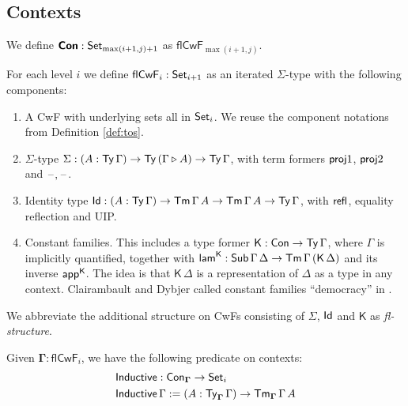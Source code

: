 \documentclass[sigplan,review,anonymous]{acmart}\settopmatter{printfolios=true,printccs=false,printacmref=false}
\newcommand{\ext}{\triangleright}
\newcommand{\Inductive}{\mathsf{Inductive}}
\newcommand{\Sg}{\Sigma}
\newcommand{\flCwF}{\mathsf{flCwF}}
\newcommand{\Kfam}{\mathsf{K}}
\newcommand{\lamK}{\mathsf{lam}^{\K}}
\newcommand{\appK}{\mathsf{app}^{\K}}
\newcommand{\bCon}{\boldsymbol{\Con}}
\newcommand{\bGamma}{\boldsymbol{\Gamma}}
\begin{document}
\subsection{Contexts}

We define $\bCon : \Set_{\max(i+1,j)+1}$ as $\flCwF_{\max(i+1,j)}$.

\begin{definition}\label{def:flCwF}
For each level $i$ we define $\flCwF_i : \Set_{i+1}$ as an iterated $\Sigma$-type
with the following components:
\begin{enumerate}
  \item A CwF with underlying sets all in $\mathsf{Set}_i$. We reuse the component
    notations from Definition \ref{def:tos}.
  \item $\Sigma$-type $\Sg : (A : \Ty\,\Gamma)\ra \Ty\,(\Gamma \ext A)
    \ra \Ty\,\Gamma$, with term formers $\mathsf{proj}1$, $\mathsf{proj}2$ and $\mathord{\hspace{1pt}\text{--}\hspace{1pt}},\mathord{\hspace{1pt}\text{--}\hspace{1pt}}$.
  \item Identity type $\mathsf{Id} : (A : \mathsf{Ty}\,\Gamma)\rightarrow \mathsf{Tm}\,\Gamma\,A\rightarrow
    \mathsf{Tm}\,\Gamma\,A\rightarrow \mathsf{Ty}\,\Gamma$, with $\mathsf{refl}$, equality reflection and UIP.
  \item Constant families. This includes a type former $\Kfam : \Con \ra
    \Ty\,\Gamma$, where $\Gamma$ is implicitly quantified, together with $\lamK
    : \Sub\,\Gamma\,\Delta \ra \Tm\,\Gamma\,(\Kfam\,\Delta)$ and its inverse
    $\appK$. The idea is that $\Kfam\,\Delta$ is a representation of $\Delta$ as
    a type in any context. Clairambault and Dybjer called constant families
    ``democracy'' in \cite{clairambault2014biequivalence}.
\end{enumerate}
\end{definition}

\begin{definition} We abbreviate the additional structure on CwFs consisting of $\Sigma$, $\mathsf{Id}$ and
$\Kfam$ as \emph{fl-structure}.
\end{definition}


\begin{definition}\label{def:induction}
Given $\bGamma : \flCwF_i$, we have the following predicate on contexts:
\begin{alignat*}{3}
  & \Inductive : \Con_{\bGamma} \ra \Set_i \\
  & \Inductive\,\Gamma := (A : \Ty_{\bGamma}\,\Gamma)\ra \Tm_{\bGamma}\,\Gamma\,A
\end{alignat*}
\end{definition}
\end{document}
